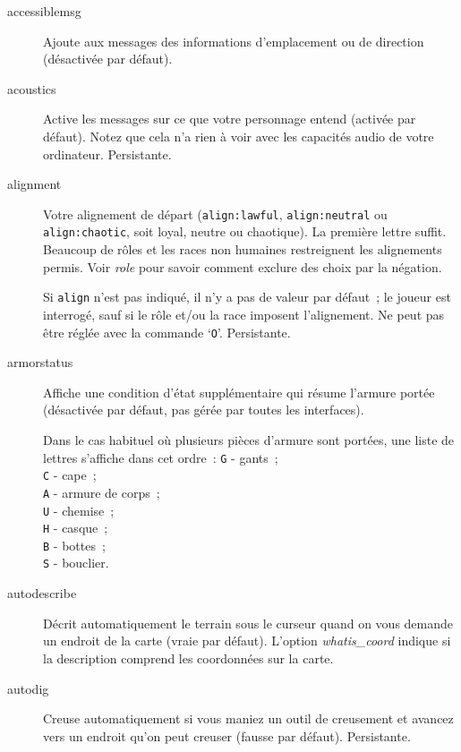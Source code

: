 \documentclass[titlepage]{article}
\begin{document}
\begin{description}
\item[{accessiblemsg}]
Ajoute aux messages des informations d'emplacement ou de direction
(désactivée par défaut).

\item[{acoustics}]
Active les messages sur ce que votre personnage entend (activée par
défaut).
Notez que cela n'a rien à voir avec les capacités audio de votre
ordinateur.
Persistante.

\item[{alignment}]
Votre alignement de départ (\texttt{align:lawful}, \texttt{align:neutral} ou
\texttt{align:chaotic}, soit loyal, neutre ou chaotique).
La première lettre suffit.
Beaucoup de rôles et les races non humaines restreignent les alignements
permis.
Voir
\textit{role}
pour savoir comment exclure des choix par la négation.


Si \texttt{align} n'est pas indiqué, il n'y a pas de valeur par défaut~; le
joueur est interrogé, sauf si le rôle et/ou la race imposent l'alignement.
Ne peut pas être réglée avec la commande `\texttt{O}'.
Persistante.

\item[{armorstatus}]
Affiche une condition d'état supplémentaire qui résume l'armure portée
(désactivée par défaut, pas gérée par toutes les interfaces).


Dans le cas habituel où plusieurs pièces d'armure sont portées, une liste
de lettres s'affiche dans cet ordre~:
\texttt{G} - gants~;\\
\texttt{C} - cape~;\\
\texttt{A} - armure de corps~;\\
\texttt{U} - chemise~;\\
\texttt{H} - casque~;\\
\texttt{B} - bottes~;\\
\texttt{S} - bouclier.\\

\item[{autodescribe}]
Décrit automatiquement le terrain sous le curseur quand on vous demande un
endroit de la carte (vraie par défaut).
L'option
\textit{whatis\_coord}
indique si la description comprend les coordonnées sur la carte.

\item[{autodig}]
Creuse automatiquement si vous maniez un outil de creusement et avancez
vers un endroit qu'on peut creuser (fausse par défaut).
Persistante.


\end{description}
\end{document}
